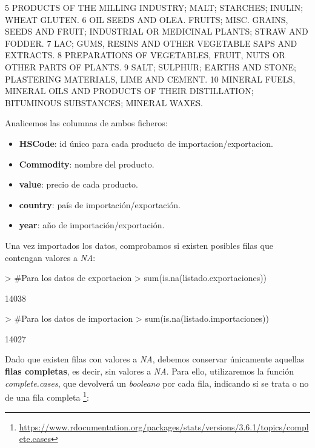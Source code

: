 \documentclass [a4paper] {article}
\begin{document}
{\begin{Schunk}
\begin{Soutput}
5                                       PRODUCTS OF THE MILLING INDUSTRY; MALT; STARCHES; INULIN; WHEAT GLUTEN.
6  OIL SEEDS AND OLEA. FRUITS; MISC. GRAINS, SEEDS AND FRUIT; INDUSTRIAL OR MEDICINAL PLANTS; STRAW AND FODDER.
7                                                      LAC; GUMS, RESINS AND OTHER VEGETABLE SAPS AND EXTRACTS.
8                                             PREPARATIONS OF VEGETABLES, FRUIT, NUTS OR OTHER PARTS OF PLANTS.
9                                       SALT; SULPHUR; EARTHS AND STONE; PLASTERING MATERIALS, LIME AND CEMENT.
10        MINERAL FUELS, MINERAL OILS AND PRODUCTS OF THEIR DISTILLATION; BITUMINOUS SUBSTANCES; MINERAL WAXES.
\end{Soutput}
\end{Schunk}
}

Analicemos las columnas de ambos ficheros:
\begin{itemize}
    \item \textbf{HSCode}: id único para cada producto de importacion/exportacion.
    \item \textbf{Commodity}: nombre del producto.
    \item \textbf{value}: precio de cada producto.
    \item \textbf{country}: país de importación/exportación.
    \item \textbf{year}: año de importación/exportación.
\end{itemize}

Una vez importados los datos, comprobamos si existen posibles filas que contengan valores a \textit{NA}:

\begin{Schunk}
\begin{Sinput}
> #Para los datos de exportacion
> sum(is.na(listado.exportaciones))
\end{Sinput}
\begin{Soutput}
[1] 14038
\end{Soutput}
\begin{Sinput}
> #Para los datos de importacion
> sum(is.na(listado.importaciones))
\end{Sinput}
\begin{Soutput}
[1] 14027
\end{Soutput}
\end{Schunk}
Dado que existen filas con valores a \textit{NA}, debemos conservar únicamente aquellas \textbf{filas completas}, es decir, sin valores a \textit{NA}. Para ello, utilizaremos la función \textit{complete.cases}, que
devolverá un \textit{booleano} por cada fila, indicando si se trata o no de una fila completa \footnote{\url{https://www.rdocumentation.org/packages/stats/versions/3.6.1/topics/complete.cases}}:
\end{document}
